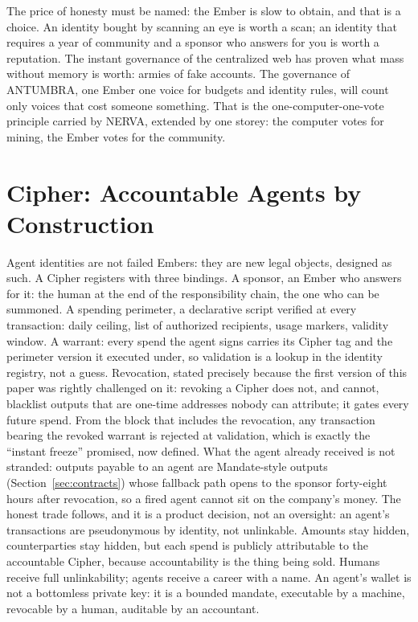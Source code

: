 The price of honesty must be named: the Ember is slow to obtain, and that
is a choice. An identity bought by scanning an eye is worth a scan; an
identity that requires a year of community and a sponsor who answers for
you is worth a reputation. The instant governance of the centralized web
has proven what mass without memory is worth: armies of fake accounts.
The governance of ANTUMBRA, one Ember one voice for budgets and identity
rules, will count only voices that cost someone something. That is the
one-computer-one-vote principle carried by NERVA, extended by one storey:
the computer votes for mining, the Ember votes for the community.

\section{Cipher: Accountable Agents by Construction}\label{sec:cipher}

Agent identities are not failed Embers: they are new legal objects,
designed as such. A Cipher registers with three bindings. A sponsor, an
Ember who answers for it: the human at the end of the responsibility
chain, the one who can be summoned. A spending perimeter, a declarative
script verified at every transaction: daily ceiling, list of authorized
recipients, usage markers, validity window. A warrant: every spend the
agent signs carries its Cipher tag and the perimeter version it executed
under, so validation is a lookup in the identity registry, not a guess.
Revocation, stated precisely because the first version of this paper
was rightly challenged on it: revoking a Cipher does not, and cannot,
blacklist outputs that are one-time addresses nobody can attribute; it
gates every future spend. From the block that includes the revocation,
any transaction bearing the revoked warrant is rejected at validation,
which is exactly the ``instant freeze'' promised, now defined. What the
agent already received is not stranded: outputs payable to an agent are
Mandate-style outputs (Section~\ref{sec:contracts}) whose fallback path
opens to the sponsor forty-eight hours after revocation, so a fired
agent cannot sit on the company's money. The honest trade follows, and
it is a product decision, not an oversight: an agent's transactions are
pseudonymous by identity, not unlinkable. Amounts stay hidden,
counterparties stay hidden, but each spend is publicly attributable to
the accountable Cipher, because accountability is the thing being sold.
Humans receive full unlinkability; agents receive a career with a
name. An agent's wallet is not a bottomless
private key: it is a bounded mandate, executable by a machine, revocable
by a human, auditable by an accountant.

